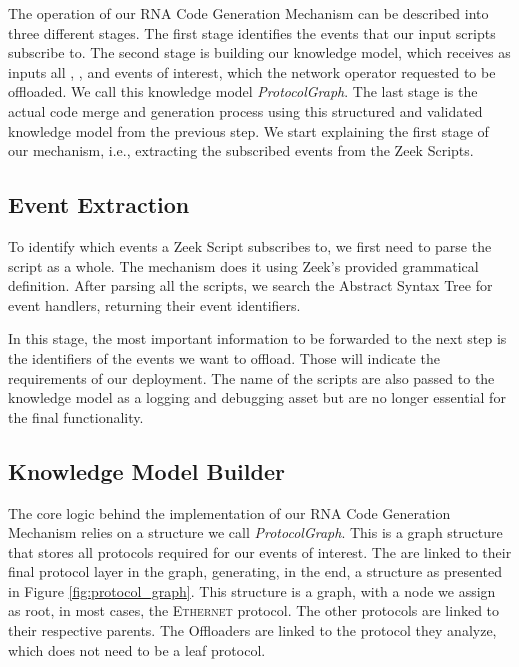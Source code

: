 The operation of our RNA Code Generation Mechanism can be described into three different stages. The first stage identifies the events that our input scripts subscribe to. The second stage is building our knowledge model, which receives as inputs all \ProtocolTemplates{}, \Offloaders{}, and events of interest, which the network operator requested to be offloaded. We call this knowledge model \textit{ProtocolGraph}. The last stage is the actual code merge and generation process using this structured and validated knowledge model from the previous step. We start explaining the first stage of our mechanism, i.e., extracting the subscribed events from the Zeek Scripts.

\subsection{Event Extraction}

To identify which events a Zeek Script subscribes to, we first need to parse the script as a whole. The mechanism does it using Zeek's provided grammatical definition. After parsing all the scripts, we search the Abstract Syntax Tree for event handlers, returning their event identifiers.

In this stage, the most important information to be forwarded to the next step is the identifiers of the events we want to offload. Those will indicate the requirements of our deployment. The name of the scripts are also passed to the knowledge model as a logging and debugging asset but are no longer essential for the final functionality.

\subsection{Knowledge Model Builder}

The core logic behind the implementation of our RNA Code Generation Mechanism relies on a structure we call \textit{ProtocolGraph}. This is a graph structure that stores all protocols required for our events of interest. The \Offloaders{} are linked to their final protocol layer in the graph, generating, in the end, a structure as presented in Figure \ref{fig:protocol_graph}. This structure is a graph, with a node we assign as root, in most cases, the \textsc{Ethernet} protocol. The other protocols are linked to their respective parents. The Offloaders are linked to the protocol they analyze, which does not need to be a leaf protocol.

